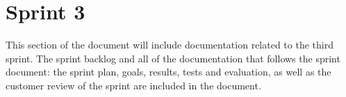 \documentclass[../document.tex]{subfiles}
\begin{document}
\section*{Sprint 3}

This section of the document will include documentation related to the third sprint. The sprint backlog and all of the documentation that follows the sprint document: the sprint plan, goals, results, tests and evaluation, as well as the customer review of the sprint are included in the document.
\end{document}
